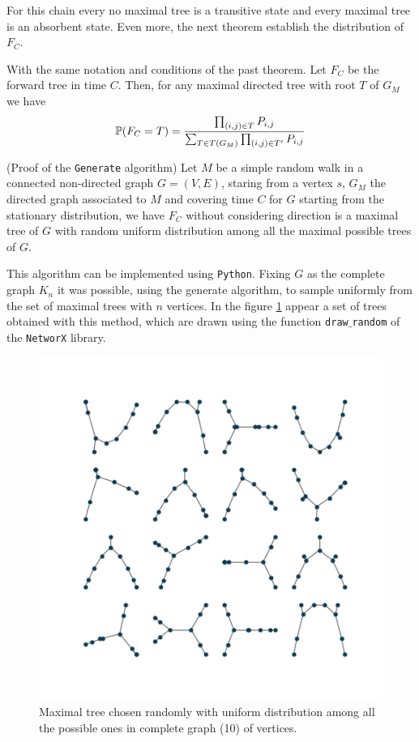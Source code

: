For this chain every no maximal tree is a transitive state and every maximal tree is an absorbent state. Even more, the next theorem establish the distribution of  $F_{C}$.

\begin{theorem}
With the same notation and conditions of the past theorem. Let $F_{C}$ be the forward tree in time $C$. Then, for any maximal directed tree with root $T$ of $G_{M}$ we have
$$\P(F_{C} = T) = \frac{\prod_{(i,j)\in T} P_{i,j}}{\sum_{T\in T(G_{M})} \prod_{(i,j)\in T'} P_{i,j}}$$
\end{theorem}

\begin{coro}
(Proof of the \texttt{Generate} algorithm) Let $M$ be a simple random walk in a connected non-directed graph $G = (V, E)$, staring from a vertex $s$, $G_{M}$ the directed graph associated to $M$ and covering time $C$ for $G$ starting from the stationary distribution, we have $F_{C}$ without considering direction is a maximal tree of $G$ with random uniform distribution among all the maximal possible trees of $G$.
\end{coro}

This algorithm can be implemented using \texttt{Python}. Fixing $G$ as the complete graph $K_{n}$ it was possible, using the generate algorithm, to sample uniformly from the set of maximal trees with $n$ vertices. In the figure \ref{fig:RandromTrees} appear a set of trees obtained with this method, which are drawn using the function \texttt{draw$\_$random} of the \texttt{NetworX} library.

\begin{figure}[h!]
	\centering
	\includegraphics[scale=0.8]{Python/Figures/Tree-sample10.png}
	\caption{Maximal tree chosen randomly with uniform distribution among all the possible ones in complete graph (10) of vertices.}
	\label{fig:RandromTrees}
\end{figure}

